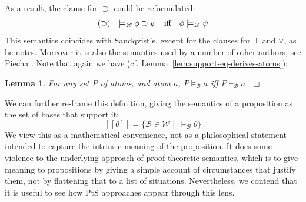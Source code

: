 \documentclass{sn-jnl}
\newcommand{\derives}[1]{\vdash_{\!#1}}
\newcommand{\base}[1]{\mathscr{#1}}
\newcommand{\worlds}{\mathcal W}
\renewcommand{\derives}[2]{\vdash_{\base{#1}}#2}
\newcommand{\kripke}[2]{\models_{\base{#1}}#2}
\newcommand{\db}[1]{[\![#1]\!]}
\newtheorem{lemma}[theorem]{Lemma}
\newcommand{\fillBox}{\hfill$\Box$}
\begin{document}
As a result, the clause for $\supset$ could be reformulated: 
\[ 
\begin{array}{lr@{\quad}c@{\quad}l}
\mbox{($\supset$)} & \kripke{B}{\phi\supset\psi} &  \mbox{iff} & \phi\kripke{B}{\psi} 
\end{array}
\]
This semantics coincides with Sandqvist's, except for the clauses for $\bot$ and $\vee$, as he notes. Moreover it is also the semantics used by a number of other authors, see Piecha \cite{Piecha2016completeness}. Note that again we have ({cf.} Lemma~\ref{lem:support-eq-derives-atoms}): 

\smallskip 

\begin{lemma}\label{lem:kripke-eq-derives-atoms}
    For any set $P$ of atoms, and atom $a$, $P\kripke{B}{a}$ iff $P\derives{B}{a}$. \fillBox  
\end{lemma}

\smallskip 

We can further re-frame this definition, giving the semantics of a proposition as the set of bases that support it: 
\[
\db{\theta} = \{\base{B} \in \worlds \mid\  \kripke{B}{\theta}\}
\]
We view this as a mathematical convenience, not as a philosophical statement intended to capture the intrinsic meaning of the proposition. It does some violence to the underlying approach of proof-theoretic semantics, which is to give meaning to propositions by giving a simple account of circumstances that justify them, not by flattening that to a list of situations. Nevertheless, we contend that it is useful to see how PtS approaches appear through this lens. 
\end{document}
